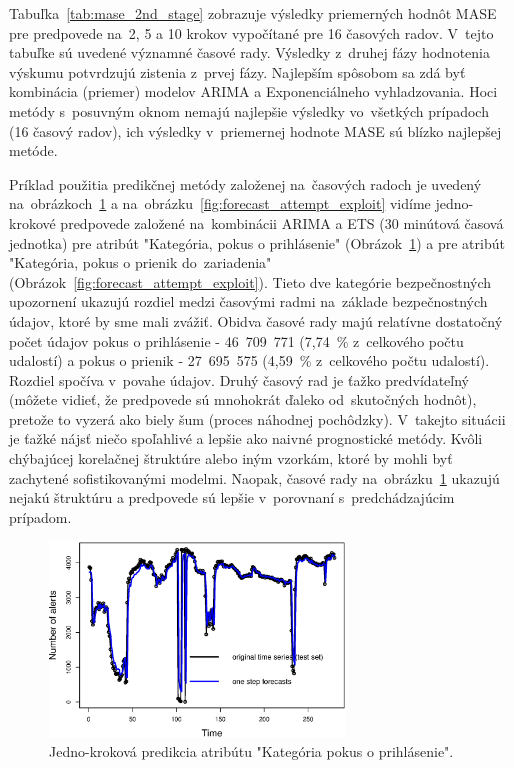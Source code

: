 \documentclass[thesismargins, thesislinespacing, openright, upjsfrontpage]{rnthesis}
\begin{document}
Tabuľka~\ref{tab:mase_2nd_stage} zobrazuje výsledky priemerných hodnôt MASE pre predpovede na~2, 5 a 10 krokov vypočítané pre 16 časových radov. V~tejto tabuľke sú uvedené významné časové rady. Výsledky z~druhej fázy hodnotenia výskumu potvrdzujú zistenia z~prvej fázy. Najlepším spôsobom sa zdá byť kombinácia (priemer) modelov ARIMA a Exponenciálneho vyhladzovania. Hoci metódy s~posuvným oknom nemajú najlepšie výsledky vo~všetkých prípadoch (16 časový radov), ich výsledky v~priemernej hodnote MASE sú blízko najlepšej metóde.

Príklad použitia predikčnej metódy založenej na~časových radoch je uvedený na~obrázkoch~\ref{fig:forecast_attempt_login} a na~obrázku~\ref{fig:forecast_attempt_exploit} vidíme jedno-krokové predpovede založené na~kombinácii ARIMA a ETS (30 minútová časová jednotka) pre atribút "Kategória, pokus o prihlásenie" (Obrázok~\ref{fig:forecast_attempt_login}) a pre atribút "Kategória, pokus o prienik do~zariadenia" (Obrázok~\ref{fig:forecast_attempt_exploit}). Tieto dve kategórie bezpečnostných upozornení ukazujú rozdiel medzi časovými radmi na~základe bezpečnostných údajov, ktoré by sme mali zvážiť. Obidva časové rady majú relatívne dostatočný počet údajov pokus o prihlásenie - 46~709~771 (7,74~\% z~celkového počtu udalostí) a pokus o prienik - 27~695~575 (4,59~\% z~celkového počtu udalostí). Rozdiel spočíva v~povahe údajov. Druhý časový rad je ťažko predvídateľný~\cite{hendry1995dynamic} (môžete vidieť, že predpovede sú mnohokrát ďaleko od~skutočných hodnôt), pretože to vyzerá ako biely šum (proces náhodnej pochôdzky). V~takejto situácii je ťažké nájsť niečo spoľahlivé a lepšie ako naivné prognostické metódy. Kvôli chýbajúcej korelačnej štruktúre alebo iným vzorkám, ktoré by mohli byť zachytené sofistikovanými modelmi. Naopak, časové rady na~obrázku~\ref{fig:forecast_attempt_login} ukazujú nejakú štruktúru a predpovede sú lepšie v~porovnaní s~predchádzajúcim prípadom.

\begin{figure}[h]
  \centering
  \includegraphics[width=0.7\textwidth]{images/item61_1step_forecasts_new.eps}
  \caption{Jedno-kroková predikcia atribútu "Kategória pokus o prihlásenie".} 
  \label{fig:forecast_attempt_login}
\end{figure}
\end{document}
